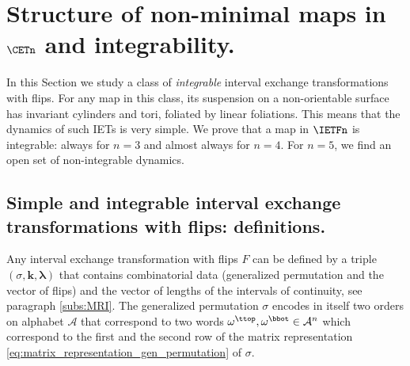 \documentclass[12pt]{article}
\theoremstyle{definition}
\begin{document}
\section{Structure of non-minimal maps in  $\CETn$ and integrability.}\label{sec:integrability_section}

In this Section we study a class of\emph{ integrable} interval exchange transformations with flips. For any map in this class, its suspension on a non-orientable surface has invariant cylinders and tori, foliated by linear foliations. This means that the dynamics of such IETs is very simple. We prove that a map in $\IETFn$ is integrable: always for $n=3$ and almost always for $n=4$. For $n=5$, we find an open set of non-integrable dynamics.

\subsection{Simple and integrable interval exchange transformations with flips: definitions.}


Any interval exchange transformation with flips $F$ can be defined by a triple $(\sigma, \boldsymbol{k}, \boldsymbol{ \lambda})$  that contains combinatorial data (generalized permutation and the vector of flips) and the vector of lengths of the intervals of continuity, see paragraph \ref{subs:MRI}. The generalized permutation $\sigma$ encodes in itself two orders on alphabet $\mathcal{A}$ that correspond to two words $\omega^{\ttop}, \omega^{\bbot} \in \mathcal{A}^n$ which correspond to the first and the second row of the matrix representation \eqref{eq:matrix_representation_gen_permutation} of $\sigma$.

\end{document}
